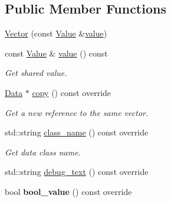 \subsection*{Public Member Functions}
\begin{DoxyCompactItemize}
\item 
\hyperlink{classcreek_1_1_vector_a15752229ba7fff29b9c1c0d855f807bd}{Vector} (const \hyperlink{classcreek_1_1_vector_a8e0b043540d45e1522d3601e599c2684}{Value} \&\hyperlink{classcreek_1_1_vector_a5d159ab122c3696cd14474b5bf87d4a7}{value})
\item 
const \hyperlink{classcreek_1_1_vector_a8e0b043540d45e1522d3601e599c2684}{Value} \& \hyperlink{classcreek_1_1_vector_a5d159ab122c3696cd14474b5bf87d4a7}{value} () const \hypertarget{classcreek_1_1_vector_a5d159ab122c3696cd14474b5bf87d4a7}{}\label{classcreek_1_1_vector_a5d159ab122c3696cd14474b5bf87d4a7}

\begin{DoxyCompactList}\small\item\em Get shared value. \end{DoxyCompactList}\item 
\hyperlink{classcreek_1_1_data}{Data} $\ast$ \hyperlink{classcreek_1_1_vector_acbcbe9a649bf57bc9559c322ba7d7464}{copy} () const  override\hypertarget{classcreek_1_1_vector_acbcbe9a649bf57bc9559c322ba7d7464}{}\label{classcreek_1_1_vector_acbcbe9a649bf57bc9559c322ba7d7464}

\begin{DoxyCompactList}\small\item\em Get a new reference to the same vector. \end{DoxyCompactList}\item 
std\+::string \hyperlink{classcreek_1_1_vector_a40c61d8219088289dbd468bcebf45fce}{class\+\_\+name} () const  override\hypertarget{classcreek_1_1_vector_a40c61d8219088289dbd468bcebf45fce}{}\label{classcreek_1_1_vector_a40c61d8219088289dbd468bcebf45fce}

\begin{DoxyCompactList}\small\item\em Get data class name. \end{DoxyCompactList}\item 
std\+::string \hyperlink{classcreek_1_1_vector_a1591fa8c4a2c655687d806d762ef235a}{debug\+\_\+text} () const  override
\item 
bool {\bfseries bool\+\_\+value} () const  override\hypertarget{classcreek_1_1_vector_af6be9d4415e6553a754997d005796c93}{}\label{classcreek_1_1_vector_af6be9d4415e6553a754997d005796c93}


\end{DoxyCompactItemize}
